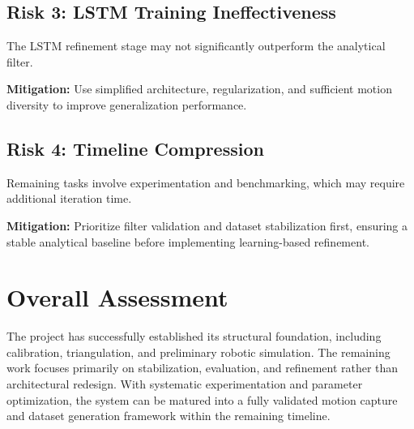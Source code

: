 \subsection*{Risk 3: LSTM Training Ineffectiveness}

The LSTM refinement stage may not significantly outperform the analytical filter.

\textbf{Mitigation:}  
Use simplified architecture, regularization, and sufficient motion diversity 
to improve generalization performance.

\subsection*{Risk 4: Timeline Compression}

Remaining tasks involve experimentation and benchmarking, which may require 
additional iteration time.

\textbf{Mitigation:}  
Prioritize filter validation and dataset stabilization first, ensuring 
a stable analytical baseline before implementing learning-based refinement.

\section{Overall Assessment}

The project has successfully established its structural foundation, including 
calibration, triangulation, and preliminary robotic simulation. The remaining 
work focuses primarily on stabilization, evaluation, and refinement rather 
than architectural redesign. With systematic experimentation and parameter 
optimization, the system can be matured into a fully validated motion capture 
and dataset generation framework within the remaining timeline.